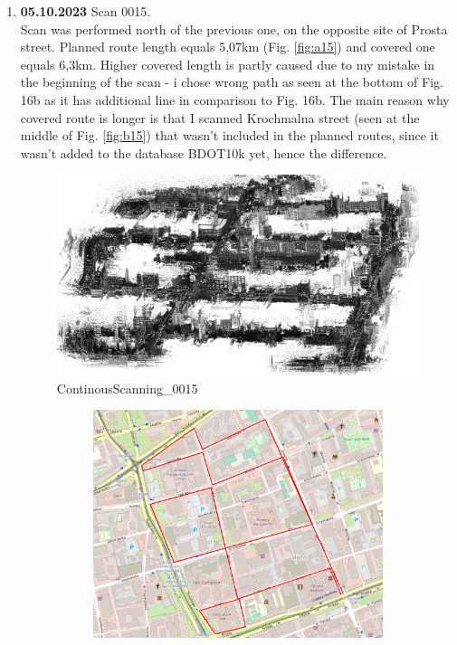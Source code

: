 \documentclass[a4paper,12pt]{book}
\begin{document}
\begin{enumerate}
	\item \textbf{05.10.2023} Scan 0015. \\
	Scan was performed north of the previous one, on the opposite site of Prosta street. Planned route length equals 5,07km (Fig. \ref{fig:a15}) and covered one equals 6,3km. Higher covered length is partly caused due to my mistake in the beginning of the scan - i chose wrong path as seen at the bottom of Fig. 16b as it has additional line in comparison to Fig. 16b. The main reason why covered route is longer is that I scanned Krochmalna street (seen at the middle of Fig. \ref{fig:b15}) that wasn't included in the planned routes, since it wasn't added to the database BDOT10k yet, hence the difference.
	\begin{figure}[H]
		\includegraphics[width=1\linewidth]{cloud15}
		\caption{ContinousScanning\_0015}
	\end{figure} 
	\begin{figure}[H]
		\centering
		\begin{subfigure}{.85\textwidth}
			\centering
			\includegraphics[width=1\linewidth]{route_p15}

\end{subfigure}
\end{figure}
\end{enumerate}
\end{document}
